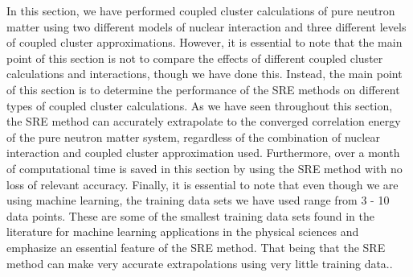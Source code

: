In this section, we have performed coupled cluster calculations of pure neutron matter using two different models of nuclear interaction and three different levels of coupled cluster approximations.  However, it is essential to note that the main point of this section is not to compare the effects of different coupled cluster calculations and interactions, though we have done this.  Instead, the main point of this section is to determine the performance of the SRE methods on different types of coupled cluster calculations.  As we have seen throughout this section, the SRE method can accurately extrapolate to the converged correlation energy of the pure neutron matter system, regardless of the combination of nuclear interaction and coupled cluster approximation used. Furthermore, over a month of computational time is saved in this section by using the SRE method with no loss of relevant accuracy. Finally, it is essential to note that even though we are using machine learning, the training data sets we have used range from 3 - 10 data points. These are some of the smallest training data sets found in the literature for machine learning applications in the physical sciences and emphasize an essential feature of the SRE method.  That being that the SRE method can make very accurate extrapolations using very little training data..
